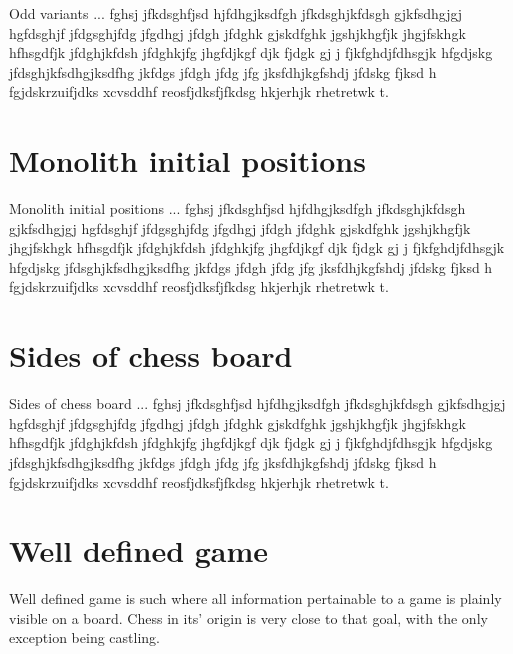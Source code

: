 \documentclass[a5paper,12pt,draft]{book} %
\begin{document}
Odd variants ... fghsj jfkdsghfjsd hjfdhgjksdfgh jfkdsghjkfdsgh gjkfsdhgjgj
hgfdsghjf jfdgsghjfdg jfgdhgj jfdgh jfdghk gjskdfghk jgshjkhgfjk jhgjfskhgk
hfhsgdfjk jfdghjkfdsh jfdghkjfg jhgfdjkgf djk fjdgk gj j fjkfghdjfdhsgjk
hfgdjskg jfdsghjkfsdhgjksdfhg jkfdgs jfdgh jfdg jfg jksfdhjkgfshdj jfdskg
fjksd h fgjdskrzuifjdks xcvsddhf reosfjdksfjfkdsg hkjerhjk rhetretwk t.

\section*{Monolith initial positions}

Monolith initial positions ... fghsj jfkdsghfjsd hjfdhgjksdfgh jfkdsghjkfdsgh gjkfsdhgjgj
hgfdsghjf jfdgsghjfdg jfgdhgj jfdgh jfdghk gjskdfghk jgshjkhgfjk jhgjfskhgk
hfhsgdfjk jfdghjkfdsh jfdghkjfg jhgfdjkgf djk fjdgk gj j fjkfghdjfdhsgjk
hfgdjskg jfdsghjkfsdhgjksdfhg jkfdgs jfdgh jfdg jfg jksfdhjkgfshdj jfdskg
fjksd h fgjdskrzuifjdks xcvsddhf reosfjdksfjfkdsg hkjerhjk rhetretwk t.

\section*{Sides of chess board}

Sides of chess board ... fghsj jfkdsghfjsd hjfdhgjksdfgh jfkdsghjkfdsgh gjkfsdhgjgj
hgfdsghjf jfdgsghjfdg jfgdhgj jfdgh jfdghk gjskdfghk jgshjkhgfjk jhgjfskhgk
hfhsgdfjk jfdghjkfdsh jfdghkjfg jhgfdjkgf djk fjdgk gj j fjkfghdjfdhsgjk
hfgdjskg jfdsghjkfsdhgjksdfhg jkfdgs jfdgh jfdg jfg jksfdhjkgfshdj jfdskg
fjksd h fgjdskrzuifjdks xcvsddhf reosfjdksfjfkdsg hkjerhjk rhetretwk t.

\section*{Well defined game}

Well defined game is such where all information pertainable to a game
is plainly visible on a board. Chess in its' origin is very close to
that goal, with the only exception being castling.
\end{document}
